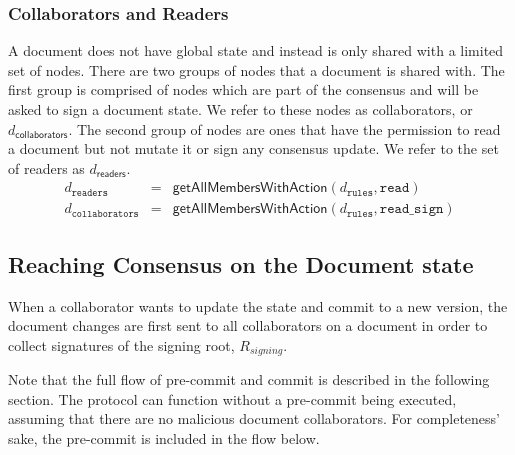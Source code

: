 \subsubsection{Collaborators and Readers}
A document does not have global state and instead is only shared with a limited set of nodes. There are two groups of nodes that a document is shared with. The first group is comprised of nodes which are part of the consensus and will be asked to sign a document state. We refer to these nodes as collaborators, or $d_{\mathsf{collaborators}}$. The second group of nodes are ones that have the permission to read a document but not mutate it or sign any consensus update. We refer to the set of readers as $d_{\mathsf{readers}}$.\\
\begin{eqnarray}
d_{\mathtt{readers}} & = & \mathsf{getAllMembersWithAction}( d_\mathtt{rules} ,\mathtt{read}) \\
d_{\mathtt{collaborators}} &  = & \mathsf{getAllMembersWithAction}( d_\mathtt{rules} ,\mathtt{read\_sign}) 
\end{eqnarray}

\subsection{Reaching Consensus on the Document state}\label{sec:reach_consensus}
When a collaborator wants to update the state and commit to a new version, the document changes are first sent to all collaborators on a document in order to collect signatures of the signing root, $R_{signing}$.

Note that the full flow of pre-commit and commit is described in the following section. The protocol can function without a pre-commit being executed, assuming that there are no malicious document collaborators. For completeness' sake, the pre-commit is included in the flow below.

